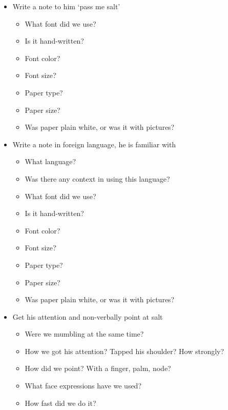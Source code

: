\documentclass{article}
\begin{document}
\begin{itemize}
                \item Write a note to him `pass me salt'
                \begin{itemize}
                    \item What font did we use?
                    \item Is it hand-written?
                    \item Font color?
                    \item Font size?
                    \item Paper type?
                    \item Paper size?
                    \item Was paper plain white, or was it with pictures?
                \end{itemize}

                \item Write a note in foreign language, he is familiar with
                \begin{itemize}
                    \item What language?
                    \item Was there any context in using this language?
                    \item What font did we use?
                    \item Is it hand-written?
                    \item Font color?
                    \item Font size?
                    \item Paper type?
                    \item Paper size?
                    \item Was paper plain white, or was it with pictures?
                \end{itemize}

                \item Get his attention and non-verbally point at salt
                \begin{itemize}
                    \item Were we mumbling at the same time?
                    \item How we got his attention? Tapped his shoulder? How strongly?
                    \item How did we point? With a finger, palm, node?
                    \item What face expressions have we used?
                    \item How fast did we do it? 
                \end{itemize}


\end{itemize}
\end{document}
